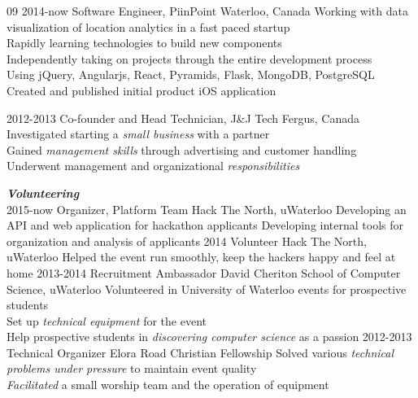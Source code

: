 \documentclass[]{friggeri-cv-short}
\newcommand{\imp}[1] {{\em #1}}
\begin{document}
\begin{entrylist}
  \entry
  	{09 2014-now}
  	{Software Engineer, PiinPoint}
  	{Waterloo, Canada}
  	{Working with data visualization of location analytics in a fast paced startup\\
     Rapidly learning technologies to build new components \\
  	 Independently taking on projects through the entire development process \\
     Using jQuery, Angularjs, React, Pyramids, Flask, MongoDB, PostgreSQL \\
     Created and published initial product iOS application
    }

  \entry
  	{2012-2013}
  	{Co-founder and Head Technician, J\&J Tech}
  	{Fergus, Canada}
  	{Investigated starting a \imp{small business} with a partner \\
	Gained \imp{management skills} through advertising and customer handling \\
	Underwent management and organizational \imp{responsibilities}}
	
\textbf{\emph{Volunteering}} \\
  \entry
  	{2015-now}
  	{Organizer, Platform Team}
  	{Hack The North, uWaterloo}
  	{Developing an API and web application for hackathon applicants}
	{Developing internal tools for organization and analysis of applicants}
  \entry
  	{2014}
  	{Volunteer}
  	{Hack The North, uWaterloo}
	{Helped the event run smoothly, keep the hackers happy and feel at home}
  \entry
  	{2013-2014}
  	{Recruitment Ambassador}
  	{David Cheriton School of Computer Science, uWaterloo}
	{Volunteered in University of Waterloo events for prospective students \\
  	Set up \imp{technical equipment}  for the event \\
	Help prospective students in \imp{discovering computer science} as a passion}
  \entry
  	{2012-2013}
  	{Technical Organizer}
  	{Elora Road Christian Fellowship}
	{Solved various \imp{technical problems under pressure} to maintain event quality\\
	\imp{Facilitated} a small worship team and the operation of equipment}
\end{entrylist}
\end{document}
